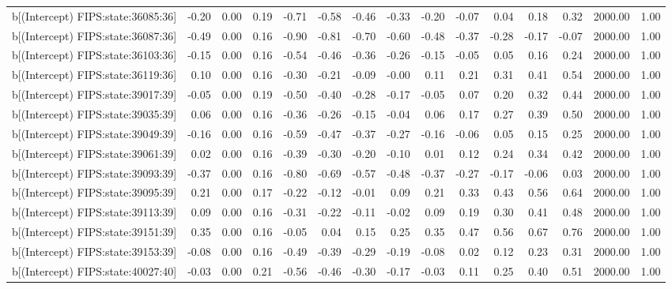 \begin{table}[ht]
\begin{tabular}{rrrrrrrrrrrrrrr}
  b[(Intercept) FIPS:state:36085:36] & -0.20 & 0.00 & 0.19 & -0.71 & -0.58 & -0.46 & -0.33 & -0.20 & -0.07 & 0.04 & 0.18 & 0.32 & 2000.00 & 1.00 \\ 
  b[(Intercept) FIPS:state:36087:36] & -0.49 & 0.00 & 0.16 & -0.90 & -0.81 & -0.70 & -0.60 & -0.48 & -0.37 & -0.28 & -0.17 & -0.07 & 2000.00 & 1.00 \\ 
  b[(Intercept) FIPS:state:36103:36] & -0.15 & 0.00 & 0.16 & -0.54 & -0.46 & -0.36 & -0.26 & -0.15 & -0.05 & 0.05 & 0.16 & 0.24 & 2000.00 & 1.00 \\ 
  b[(Intercept) FIPS:state:36119:36] & 0.10 & 0.00 & 0.16 & -0.30 & -0.21 & -0.09 & -0.00 & 0.11 & 0.21 & 0.31 & 0.41 & 0.54 & 2000.00 & 1.00 \\ 
  b[(Intercept) FIPS:state:39017:39] & -0.05 & 0.00 & 0.19 & -0.50 & -0.40 & -0.28 & -0.17 & -0.05 & 0.07 & 0.20 & 0.32 & 0.44 & 2000.00 & 1.00 \\ 
  b[(Intercept) FIPS:state:39035:39] & 0.06 & 0.00 & 0.16 & -0.36 & -0.26 & -0.15 & -0.04 & 0.06 & 0.17 & 0.27 & 0.39 & 0.50 & 2000.00 & 1.00 \\ 
  b[(Intercept) FIPS:state:39049:39] & -0.16 & 0.00 & 0.16 & -0.59 & -0.47 & -0.37 & -0.27 & -0.16 & -0.06 & 0.05 & 0.15 & 0.25 & 2000.00 & 1.00 \\ 
  b[(Intercept) FIPS:state:39061:39] & 0.02 & 0.00 & 0.16 & -0.39 & -0.30 & -0.20 & -0.10 & 0.01 & 0.12 & 0.24 & 0.34 & 0.42 & 2000.00 & 1.00 \\ 
  b[(Intercept) FIPS:state:39093:39] & -0.37 & 0.00 & 0.16 & -0.80 & -0.69 & -0.57 & -0.48 & -0.37 & -0.27 & -0.17 & -0.06 & 0.03 & 2000.00 & 1.00 \\ 
  b[(Intercept) FIPS:state:39095:39] & 0.21 & 0.00 & 0.17 & -0.22 & -0.12 & -0.01 & 0.09 & 0.21 & 0.33 & 0.43 & 0.56 & 0.64 & 2000.00 & 1.00 \\ 
  b[(Intercept) FIPS:state:39113:39] & 0.09 & 0.00 & 0.16 & -0.31 & -0.22 & -0.11 & -0.02 & 0.09 & 0.19 & 0.30 & 0.41 & 0.48 & 2000.00 & 1.00 \\ 
  b[(Intercept) FIPS:state:39151:39] & 0.35 & 0.00 & 0.16 & -0.05 & 0.04 & 0.15 & 0.25 & 0.35 & 0.47 & 0.56 & 0.67 & 0.76 & 2000.00 & 1.00 \\ 
  b[(Intercept) FIPS:state:39153:39] & -0.08 & 0.00 & 0.16 & -0.49 & -0.39 & -0.29 & -0.19 & -0.08 & 0.02 & 0.12 & 0.23 & 0.31 & 2000.00 & 1.00 \\ 
  b[(Intercept) FIPS:state:40027:40] & -0.03 & 0.00 & 0.21 & -0.56 & -0.46 & -0.30 & -0.17 & -0.03 & 0.11 & 0.25 & 0.40 & 0.51 & 2000.00 & 1.00 \\ 

\end{tabular}
\end{table}
